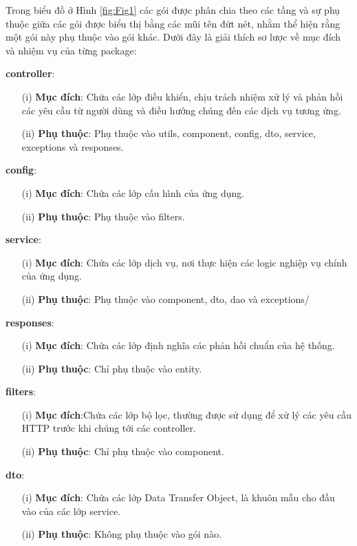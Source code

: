 \documentclass[../DoAn.tex]{subfiles}
\begin{document}
Trong biểu đồ ở Hình \ref{fig:Fig1} các gói được phân chia theo các tầng và sự phụ thuộc giữa các gói được biểu thị bằng các mũi tên đứt nét, nhằm thể hiện rằng một gói này phụ thuộc vào gói khác. Dưới đây là giải thích sơ lược về mục đích và nhiệm vụ của từng package:

\textbf{controller}:
\begin{enumerate}
    \item [(i)]\textbf{Mục đích}: Chứa các lớp điều khiển, chịu trách nhiệm xử lý và phản hồi các yêu cầu từ người dùng và điều hướng chúng đến các dịch vụ tương ứng.
    \item [(ii)]\textbf{Phụ thuộc}: Phụ thuộc vào utils, component, config, dto, service, exceptions và responses.
\end{enumerate}

\textbf{config}:
\begin{enumerate}
    \item [(i)]\textbf{Mục đích}: Chứa các lớp cấu hình của ứng dụng.
    \item [(ii)]\textbf{Phụ thuộc}: Phụ thuộc vào filters.
\end{enumerate}

\textbf{service}:
\begin{enumerate}
    \item [(i)]\textbf{Mục đích}: Chứa các lớp dịch vụ, nơi thực hiện các logic nghiệp vụ chính của ứng dụng.
    \item [(ii)]\textbf{Phụ thuộc}: Phụ thuộc vào component, dto, dao và exceptions/
\end{enumerate}

\textbf{responses}:
\begin{enumerate}
    \item [(i)]\textbf{Mục đích}: Chứa các lớp định nghĩa các phản hồi chuẩn của hệ thống.
    \item [(ii)]\textbf{Phụ thuộc}: Chỉ phụ thuộc vào entity.
\end{enumerate}

\textbf{filters}:
\begin{enumerate}
    \item [(i)]\textbf{Mục đích}:Chứa các lớp bộ lọc, thường được sử dụng để xử lý các yêu cầu HTTP trước khi chúng tới các controller.
    \item [(ii)]\textbf{Phụ thuộc}: Chỉ phụ thuộc vào component.
\end{enumerate}

\textbf{dto}:
\begin{enumerate}
    \item [(i)]\textbf{Mục đích}: Chứa các lớp Data Transfer Object, là khuôn mẫu cho đầu vào của các lớp service.
    \item [(ii)]\textbf{Phụ thuộc}: Không phụ thuộc vào gói nào.
\end{enumerate}
\end{document}
